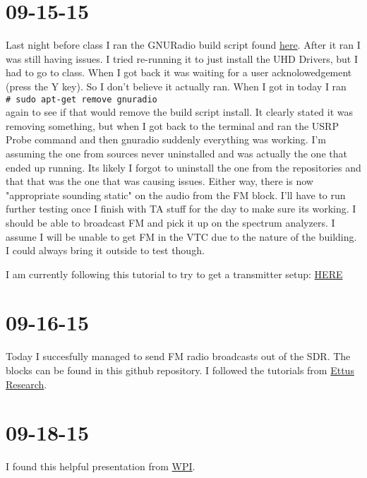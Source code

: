 \documentclass{article}
\newcommand{\shellcmd}[1]{\\\indent\indent\texttt{\footnotesize\# #1}\\}
\begin{document}
	\section{09-15-15}

	Last night before class I ran the GNURadio build script found \href{https://gnuradio.org/redmine/projects/gnuradio/wiki/InstallingGRFromSource#Using-the-build-gnuradio-script}{here}. 
After it ran I was still having issues. I tried re-running it to just install
	the UHD Drivers, but I had to go to class. When I got back it was waiting for a user acknolowedgement (press the Y key). So I don't believe it actually ran.
	When I got in today I ran \shellcmd{sudo apt-get remove gnuradio} again to see if that would remove the build script install. It clearly stated it was removing
	something, but when I got back to the terminal and ran the USRP Probe command and then gnuradio suddenly everything was working. I'm assuming the one from
	sources never uninstalled and was actually the one that ended up running. Its likely I forgot to uninstall the one from the repositories and that that was
	the one that was causing issues. Either way, there is now "appropriate sounding static" on the audio from the FM block. I'll have to run further testing
	once I finish with TA stuff for the day to make sure its working. I should be able to broadcast FM and pick it up on the spectrum analyzers. I assume
	I will be unable to get FM in the VTC due to the nature of the building. I could always bring it outside to test though. 

	I am currently following this tutorial to try to get a transmitter setup:
	\href{http://wiki.opendigitalradio.org/Simple\_FM\_transmitter\_using\_gnuradio}{HERE}	

	\section{09-16-15}
	
	Today I succesfully managed to send FM radio broadcasts out of the SDR. The blocks can be found in this github repository. 
	I followed the tutorials from \href{http://files.ettus.com/tutorials/labs/Lab_1-5.pdf}{Ettus Research}. 

	\section{09-18-15}

	I found this helpful presentation from \href{http://ecewp.ece.wpi.edu/wordpress/wireless/files/2011/11/crtextbook\_ch18.pdf}{WPI}. 
\end{document}
